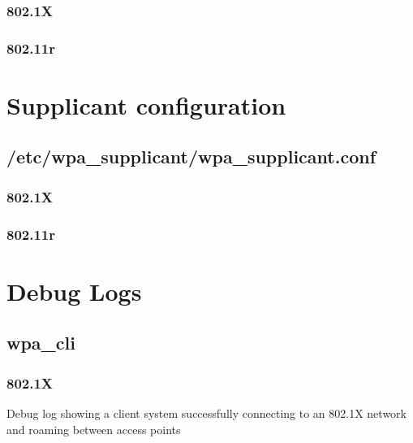 \subsubsection{802.1X}


\subsubsection{802.11r}


\section{Supplicant configuration}
\label{sec:Code;sub:supplicant}

\subsection{/etc/wpa\_supplicant/wpa\_supplicant.conf}
\subsubsection{802.1X}


\subsubsection{802.11r}


\section{Debug Logs}
\subsection{wpa\_cli}
\subsubsection{802.1X}
Debug log showing a client system successfully connecting to an 802.1X network and roaming between access points



